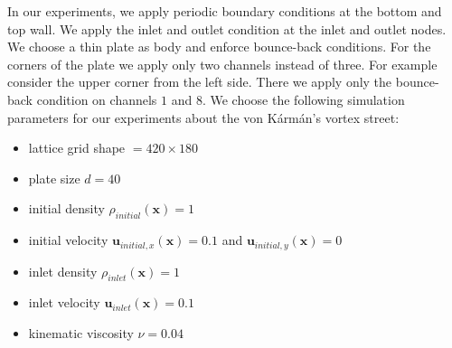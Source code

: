 \documentclass[a4paper,11pt, footsepline]{book}
\begin{document}
In our experiments, we apply periodic boundary conditions at the bottom and top wall. We apply the inlet and outlet condition at the inlet and outlet nodes. We choose a thin plate as body and enforce bounce-back conditions. For the corners of the plate we apply only two channels instead of three. For example consider the upper corner from the left side. There we apply only the bounce-back condition on channels $1$ and $8$.
We choose the following simulation parameters for our experiments about the von K\'{a}rm\'{a}n's vortex street:
\begin{itemize}
\setlength\itemsep{0.15em}
\item lattice grid shape $=420\times 180$
\item plate size $d=40$
\item initial density $\rho_{initial}(\mathbf{x})=1$
\item initial velocity $\mathbf{u}_{initial, x}(\mathbf{x})=0.1$ and $\mathbf{u}_{initial, y}(\mathbf{x})=0$
\item inlet density $\rho_{inlet}(\mathbf{x})=1$
\item inlet velocity $\mathbf{u}_{inlet}(\mathbf{x})=0.1$
\item kinematic viscosity $\nu=0.04$
\end{itemize}
\end{document}
